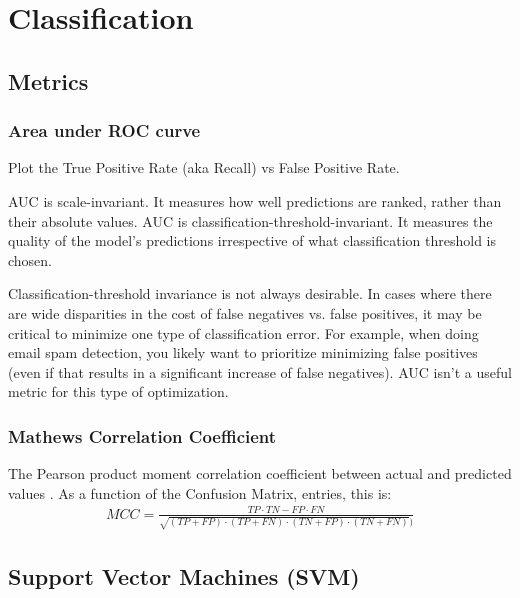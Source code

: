 \documentclass[12pt]{article}
\begin{document}
\section{Classification}
\newrefsection

\subsection{Metrics}

\subsubsection{Area under ROC curve}

Plot the True Positive Rate (aka Recall) vs False Positive Rate.

AUC is scale-invariant. It measures how well predictions are ranked, rather than
their absolute values. AUC is classification-threshold-invariant. It measures the quality of the model's predictions irrespective of what classification threshold is chosen.

Classification-threshold invariance is not always desirable. In cases where
there are wide disparities in the cost of false negatives vs. false positives,
it may be critical to minimize one type of classification error. For example,
when doing email spam detection, you likely want to prioritize minimizing false
positives (even if that results in a significant increase of false negatives).
AUC isn't a useful metric for this type of optimization.

\subsubsection{Mathews Correlation Coefficient}

The Pearson product moment correlation coefficient between actual and predicted
values \cite[Methods]{ChiccoJurman2020}. As a function of the Confusion Matrix, entries, this is:
\begin{align*}
  MCC = \frac{TP \cdot TN - FP \cdot FN}{\sqrt{(TP+FP)\cdot(TP + FN) \cdot (TN+FP) \cdot (TN+FN)})}
\end{align*}



\subsection{Support Vector Machines (SVM)}

\cite{Burges2004}
\end{document}
